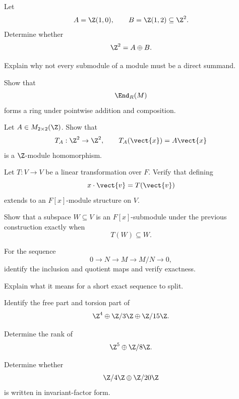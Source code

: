 \begin{exercise}[2]
Let
\[ A=\Z(1,0),\qquad B=\Z(1,2)\subseteq\Z^2. \]
Determine whether
\[ \Z^2=A\oplus B. \]
\end{exercise}

\begin{exercise}[2]
Explain why not every submodule of a module must be a direct summand.
\end{exercise}

\begin{exercise}[2]
Show that
\[ \End_R(M) \]
forms a ring under pointwise addition and composition.
\end{exercise}

\begin{exercise}[2]
Let \(A\in M_{2\times2}(\Z)\). Show that
\[ T_A:\Z^2\to\Z^2,\qquad T_A(\vect{x})=A\vect{x} \]
is a \(\Z\)-module homomorphism.
\end{exercise}

\begin{exercise}[2]
Let \(T:V\to V\) be a linear transformation over \(F\). Verify that defining
\[ x\cdot\vect{v}=T(\vect{v}) \]
extends to an \(F[x]\)-module structure on \(V\).
\end{exercise}

\begin{exercise}[2]
Show that a subspace \(W\subseteq V\) is an \(F[x]\)-submodule under the
previous construction exactly when
\[ T(W)\subseteq W. \]
\end{exercise}

\begin{exercise}[2]
For the sequence
\[ 0\to N\to M\to M/N\to0, \]
identify the inclusion and quotient maps and verify exactness.
\end{exercise}

\begin{exercise}[2]
Explain what it means for a short exact sequence to split.
\end{exercise}

\begin{exercise}[1]
Identify the free part and torsion part of
\[ \Z^4\oplus\Z/3\Z\oplus\Z/15\Z. \]
\end{exercise}

\begin{exercise}[2]
Determine the rank of
\[ \Z^5\oplus\Z/8\Z. \]
\end{exercise}

\begin{exercise}[2]
Determine whether
\[ \Z/4\Z\oplus\Z/20\Z \]
is written in invariant-factor form.
\end{exercise}

